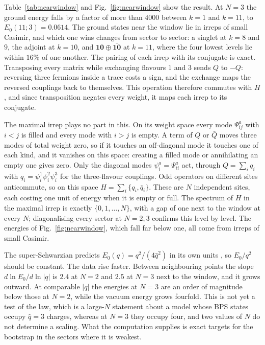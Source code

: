 \documentclass[10pt]{article}
\newcommand{\bQ}{\bar Q}
\begin{document}
Table~\ref{tab:nearwindow} and Fig.~\ref{fig:nearwindow} show the result. At $N=3$ the ground energy falls by a
factor of more than $4000$ between $k=1$ and $k=11$, to $E_0(11;3)=0.0614$. The ground states near the window
lie in irreps of small Casimir, and which one wins changes from sector to sector: a singlet at $k=8$ and $9$, the
adjoint at $k=10$, and $\mathbf{10}\oplus\overline{\mathbf{10}}$ at $k=11$, where the four lowest levels lie
within $16\%$ of one another. The pairing of each irrep with its conjugate is exact. Transposing every matrix
while exchanging flavours $1$ and $3$ sends $Q$ to $-Q$: reversing three fermions inside a trace costs a sign,
and the exchange maps the reversed couplings back to themselves. This operation therefore commutes with $H$,
and since transposition negates every weight, it maps each irrep to its conjugate.

The maximal irrep plays no part in this. On its weight space every mode $\Psi^a_{ij}$ with $i<j$ is filled and
every mode with $i>j$ is empty. A term of $Q$ or $\bQ$ moves three modes of total weight zero, so if it touches
an off-diagonal mode it touches one of each kind, and it vanishes on this space: creating a filled mode or
annihilating an empty one gives zero. Only the diagonal modes $\psi^a_i=\Psi^a_{ii}$ act, through
$Q=\sum_iq_i$ with $q_i=\psi^1_i\psi^2_i\psi^3_i$ for the three-flavour couplings. Odd operators on different
sites anticommute, so on this space $H=\sum_i\{q_i,\bar q_i\}$. These are $N$ independent sites, each costing
one unit of energy when it is empty or full. The spectrum of $H$ in the maximal irrep is exactly
$\{0,1,\dots,N\}$, with a gap of one next to the window at every $N$; diagonalising every sector at $N=2,3$
confirms this level by level. The energies of Fig.~\ref{fig:nearwindow}, which fall far below one, all come
from irreps of small Casimir.

The super-Schwarzian predicts $E_0(q)=q^2/(4\hat q^2)$ in its own units \cite{TW}, so $E_0/q^2$ should be
constant. The data rise faster. Between neighbouring points the slope $d\ln E_0/d\ln|q|$ is $2.4$ at $N=2$ and
$2.5$ at $N=3$ next to the window, and it grows outward. At comparable $|q|$ the energies at $N=3$ are an order
of magnitude below those at $N=2$, while the vacuum energy grows fourfold. This is not yet a test of the law,
which is a large-$N$ statement about a model whose BPS states occupy $\hat q=3$ charges, whereas at $N=3$ they
occupy four, and two values of $N$ do not determine a scaling. What the computation supplies is exact targets
for the bootstrap in the sectors where it is weakest.
\end{document}
